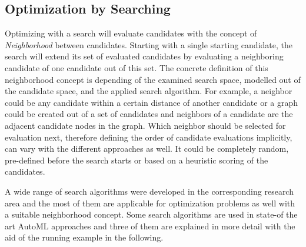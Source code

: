 \subsection{Optimization by Searching}
\label{sec:theory:optimization:search}
Optimizing with a search will evaluate candidates with the concept of \textit{Neighborhood} between candidates.
Starting with a single starting candidate, the search will extend its set of evaluated candidates by evaluating a neighboring candidate of one candidate out of this set.
The concrete definition of this neighborhood concept is depending of the examined search space, modelled out of the candidate space, and the applied search algorithm.
For example, a neighbor could be any candidate within a certain distance of another candidate or a graph could be created out of a set of candidates and neighbors of a candidate are the adjacent candidate nodes in the graph.
Which neighbor should be selected for evaluation next, therefore defining the order of candidate evaluations implicitly, can vary with the different approaches as well.
It could be completely random, pre-defined before the search starts or based on a heuristic scoring of the candidates.

A wide range of search algorithms were developed in the corresponding research area and the most of them are applicable for optimization problems as well with a suitable neighborhood concept.
Some search algorithms are used in state-of the art AutoML approaches and three of them are explained in more detail with the aid of the running example in the following.


